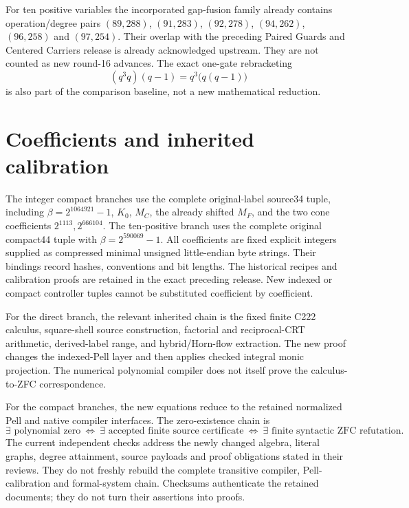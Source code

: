 For ten positive variables the incorporated gap-fusion family already contains
operation/degree pairs $(89,288)$, $(91,283)$, $(92,278)$,
$(94,262)$, $(96,258)$ and $(97,254)$. Their overlap with the preceding
Paired Guards and Centered Carriers release is already acknowledged upstream.
They are not counted as new round-16 advances. The exact one-gate rebracketing
\[
 (q^3q)(q-1)=q^3\bigl(q(q-1)\bigr)
\]
is also part of the comparison baseline, not a new mathematical reduction.

\section{Coefficients and inherited calibration}
The integer compact branches use the complete original-label source34 tuple,
including $\beta=2^{1064921}-1$, $K_0$, $M_C$, the already shifted $M_F$,
and the two cone coefficients $2^{1113},2^{666104}$. The ten-positive branch
uses the complete original compact44 tuple with $\beta=2^{590069}-1$.
All coefficients are fixed explicit integers supplied as compressed minimal
unsigned little-endian byte strings. Their bindings record hashes, conventions
and bit lengths. The historical recipes and calibration proofs are retained
in the exact preceding release. New indexed or compact controller tuples
cannot be substituted coefficient by coefficient.

For the direct branch, the relevant inherited chain is the fixed finite
C222 calculus, square-shell source construction, factorial and reciprocal-CRT
arithmetic, derived-label range, and hybrid/Horn-flow extraction. The new proof
changes the indexed-Pell layer and then applies checked integral monic
projection. The numerical polynomial compiler does not itself prove the
calculus-to-ZFC correspondence.

For the compact branches, the new equations reduce to the retained normalized
Pell and native compiler interfaces. The zero-existence chain is
\[
 \exists\text{ polynomial zero}
 \ \Longleftrightarrow\
 \exists\text{ accepted finite source certificate}
 \ \Longleftrightarrow\
 \exists\text{ finite syntactic ZFC refutation}.
\]
The current independent checks address the newly changed algebra, literal
graphs, degree attainment, source payloads and proof obligations stated in
their reviews. They do not freshly rebuild the complete transitive compiler,
Pell-calibration and formal-system chain. Checksums authenticate the retained
documents; they do not turn their assertions into proofs.
